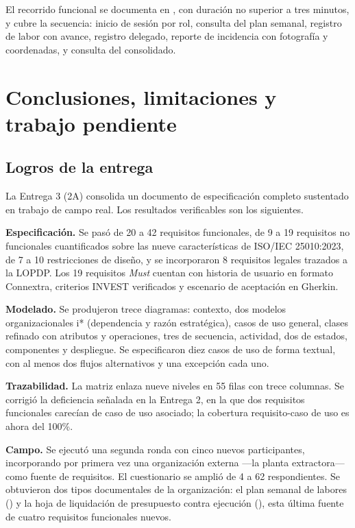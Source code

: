 El recorrido funcional se documenta en , con duración no superior a tres
minutos, y cubre la secuencia: inicio de sesión por rol, consulta del plan semanal, registro de
labor con avance, registro delegado, reporte de incidencia con fotografía y coordenadas, y consulta
del consolidado.

\newpage
\section{Conclusiones, limitaciones y trabajo pendiente}

\subsection{Logros de la entrega}

La Entrega 3 (2A) consolida un documento de especificación completo sustentado en trabajo de campo
real. Los resultados verificables son los siguientes.

\textbf{Especificación.} Se pasó de 20 a 42 requisitos funcionales, de 9 a 19 requisitos no
funcionales cuantificados sobre las nueve características de ISO/IEC 25010:2023, de 7 a 10
restricciones de diseño, y se incorporaron 8 requisitos legales trazados a la LOPDP. Los 19
requisitos \emph{Must} cuentan con historia de usuario en formato Connextra, criterios INVEST
verificados y escenario de aceptación en Gherkin.

\textbf{Modelado.} Se produjeron trece diagramas: contexto, dos modelos organizacionales i*
(dependencia y razón estratégica), casos de uso general, clases refinado con atributos y
operaciones, tres de secuencia, actividad, dos de estados, componentes y despliegue. Se especificaron
diez casos de uso de forma textual, con al menos dos flujos alternativos y una excepción cada uno.

\textbf{Trazabilidad.} La matriz enlaza nueve niveles en 55 filas con trece columnas. Se corrigió la
deficiencia señalada en la Entrega 2, en la que dos requisitos funcionales carecían de caso de uso
asociado; la cobertura requisito-caso de uso es ahora del 100\%.

\textbf{Campo.} Se ejecutó una segunda ronda con cinco nuevos participantes, incorporando por
primera vez una organización externa ---la planta extractora--- como fuente de requisitos. El
cuestionario se amplió de 4 a 62 respondientes. Se obtuvieron dos tipos documentales de la
organización: el plan semanal de labores () y la hoja de liquidación de presupuesto contra
ejecución (), esta última fuente de cuatro requisitos funcionales nuevos.

